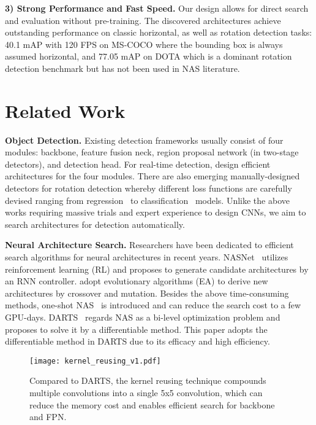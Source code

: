 \documentclass[letterpaper]{article} \usepackage{aaai22}  \usepackage{times}  \usepackage{helvet}  \usepackage{courier}  \usepackage[hyphens]{url}  \usepackage{graphicx} \urlstyle{rm} \def\UrlFont{\rm}  \usepackage{natbib}  \usepackage{caption} \DeclareCaptionStyle{ruled}{labelfont=normalfont,labelsep=colon,strut=off} \frenchspacing  \setlength{\pdfpagewidth}{8.5in}  \setlength{\pdfpageheight}{11in}
\begin{document}
\textbf{3) Strong Performance and Fast Speed.} Our design allows for direct search and evaluation without pre-training. The discovered architectures achieve outstanding performance on classic horizontal, as well as rotation detection tasks: 40.1 mAP with 120 FPS on MS-COCO where the bounding box is always assumed horizontal, and 77.05 mAP on DOTA which is a dominant rotation detection benchmark but has not been used in NAS literature.


\section{Related Work}


\textbf{Object Detection.} 
Existing detection frameworks usually consist of four modules: backbone, feature fusion neck, region proposal network (in two-stage detectors), and detection head. For real-time detection, \cite{liu2016ssd,yolov1,retinanet,bochkovskiy2020yolov4,wang2021scaled} design efficient architectures for the four modules. There are also emerging manually-designed detectors for rotation detection whereby different loss functions are carefully devised ranging from regression~\cite{redet,yang2021rethinking} to classification~\cite{yang2021dense,csl} models. Unlike the above works requiring massive trials and expert experience to design CNNs, we aim to search architectures for detection automatically.

\textbf{Neural Architecture Search.} 
Researchers have been dedicated to efficient search algorithms for neural architectures in recent years.
NASNet~\cite{zoph2018learning} utilizes reinforcement learning (RL) and proposes to generate candidate architectures by an RNN controller. \cite{real2019regularized} adopt evolutionary algorithms (EA) to derive new architectures by crossover and mutation. Besides the above time-consuming methods, one-shot NAS~\cite{bender2019understanding} is introduced and can reduce the search cost to a few GPU-days.
DARTS~\cite{liu2018darts} regards NAS as a bi-level optimization problem and proposes to solve it by a differentiable method.
This paper adopts the differentiable method in DARTS due to its efficacy and high efficiency.

\begin{figure*}[tb!]
    \centering
    \texttt{[image: kernel\_reusing\_v1.pdf]}
    \vspace{-10pt}
    \caption{Compared to DARTS, the kernel reusing technique compounds multiple convolutions into a single 5x5 convolution, which can reduce the memory cost and enables efficient search for backbone and FPN. }
    \label{fig:kernel_reuse}
\end{figure*}
\end{document}
